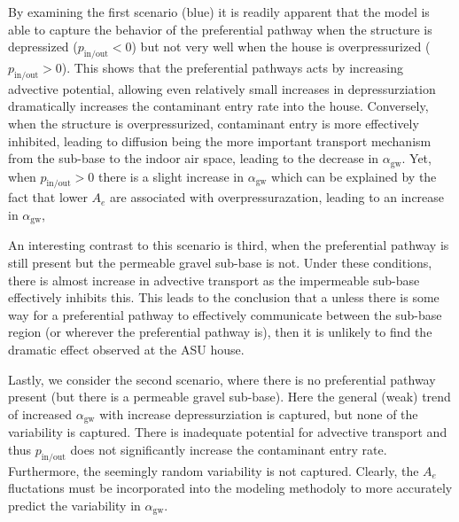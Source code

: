 \documentclass[journal=esthag,manuscript=article]{achemso}
\begin{document}
By examining the first scenario (blue) it is readily apparent that the model is able to capture the behavior of the preferential pathway when the structure is depressized ($p_\mathrm{in/out} < 0$) but not very well when the house is overpressurized ($p_\mathrm{in/out} > 0$).
This shows that the preferential pathways acts by increasing advective potential, allowing even relatively small increases in depressurziation dramatically increases the contaminant entry rate into the house.
Conversely, when the structure is overpressurized, contaminant entry is more effectively inhibited, leading to diffusion being the more important transport mechanism from the sub-base to the indoor air space, leading to the decrease in $\alpha_\mathrm{gw}$.
Yet, when $p_\mathrm{in/out} > 0$ there is a slight increase in $\alpha_\mathrm{gw}$ which can be explained by the fact that lower $A_e$ are associated with overpressurazation, leading to an increase in $\alpha_\mathrm{gw}$,

An interesting contrast to this scenario is third, when the preferential pathway is still present but the permeable gravel sub-base is not.
Under these conditions, there is almost increase in advective transport as the impermeable sub-base effectively inhibits this.
This leads to the conclusion that a unless there is some way for a preferential pathway to effectively communicate between the sub-base region (or wherever the preferential pathway is), then it is unlikely to find the dramatic effect observed at the ASU house.

Lastly, we consider the second scenario, where there is no preferential pathway present (but there is a permeable gravel sub-base).
Here the general (weak) trend of increased $\alpha_\mathrm{gw}$ with increase depressurziation is captured, but none of the variability is captured.
There is inadequate potential for advective transport and thus $p_\mathrm{in/out}$ does not significantly increase the contaminant entry rate.
Furthermore, the seemingly random variability is not captured.
Clearly, the $A_e$ fluctations must be incorporated into the modeling methodoly to more accurately predict the variability in $\alpha_\mathrm{gw}$.

\end{document}
